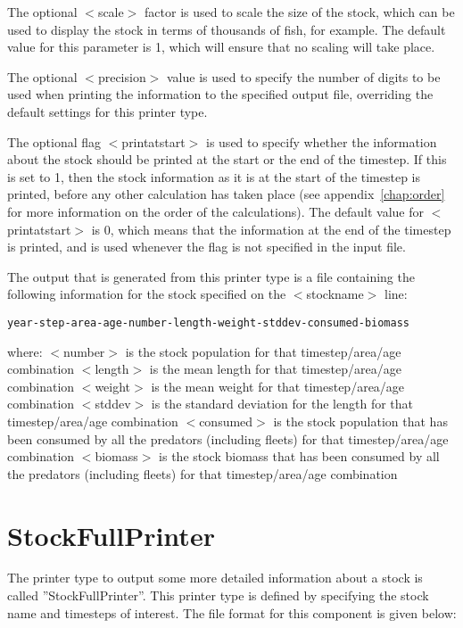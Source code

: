 \documentclass[10pt,twoside]{book}
\begin{document}
The optional $<$scale$>$ factor is used to scale the size of the stock, which can be used to display the stock in terms of thousands of fish, for example.  The default value for this parameter is 1, which will ensure that no scaling will take place.

\bigskip
The optional $<$precision$>$ value is used to specify the number of digits to be used when printing the information to the specified output file, overriding the default settings for this printer type.

\bigskip
The optional flag $<$printatstart$>$ is used to specify whether the information about the stock should be printed at the start or the end of the timestep.  If this is set to 1, then the stock information as it is at the start of the timestep is printed, before any other calculation has taken place (see appendix~\ref{chap:order} for more information on the order of the calculations).  The default value for $<$printatstart$>$ is 0, which means that the information at the end of the timestep is printed, and is used whenever the flag is not specified in the input file.

\bigskip
The output that is generated from this printer type is a file containing the following information for the stock specified on the $<$stockname$>$ line:

{\small\begin{verbatim}
year-step-area-age-number-length-weight-stddev-consumed-biomass
\end{verbatim}}

where:\newline
$<$number$>$ is the stock population for that timestep/area/age combination\newline
$<$length$>$ is the mean length for that timestep/area/age combination\newline
$<$weight$>$ is the mean weight for that timestep/area/age combination\newline
$<$stddev$>$ is the standard deviation for the length for that timestep/area/age combination\newline
$<$consumed$>$ is the stock population that has been consumed by all the predators (including fleets) for that timestep/area/age combination\newline
$<$biomass$>$ is the stock biomass that has been consumed by all the predators (including fleets) for that timestep/area/age combination

\section{StockFullPrinter}\label{sec:stockfullprinter}
The printer type to output some more detailed information about a stock is called ''StockFullPrinter''.  This printer type is defined by specifying the stock name and timesteps of interest.  The file format for this component is given below:
\end{document}
